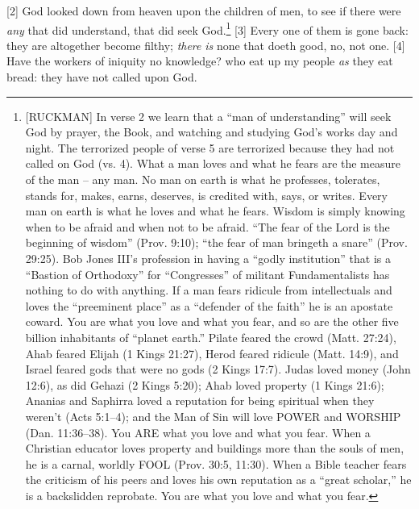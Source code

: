 [2] \textcolor[cmyk]{0.99998,1,0,0}{God looked down from heaven upon the children of men, to see if there were \emph{any} that did understand, that did seek God.}\footnote{[RUCKMAN] In verse 2 we learn that a ``man of understanding'' will seek God by prayer, the Book, and watching and studying God’s works day and night. The terrorized people of verse 5 are terrorized because they had not called on God (vs. 4). What a man loves and what he fears are the measure of the man -- any man. No man on earth is what he professes, tolerates, stands for, makes, earns, deserves, is credited with, says, or writes. Every man on earth is what he loves and what he fears. Wisdom is simply knowing when to be afraid and when not to be afraid. ``The fear of the Lord is the beginning of wisdom'' (Prov. 9:10); ``the fear of man bringeth a snare'' (Prov. 29:25). Bob Jones III’s profession in having a ``godly institution'' that is a ``Bastion of Orthodoxy'' for ``Congresses'' of militant Fundamentalists has nothing to do with anything. If a man fears ridicule from intellectuals and loves the ``preeminent place'' as a ``defender of the faith'' he is an apostate coward. You are what you love and what you fear, and so are the other five billion inhabitants of “planet earth.” Pilate feared the crowd (Matt. 27:24), Ahab feared Elijah (1 Kings 21:27), Herod feared ridicule (Matt. 14:9), and Israel feared gods that were no gods (2 Kings 17:7). Judas loved money (John 12:6), as did Gehazi (2 Kings 5:20); Ahab loved property (1 Kings 21:6); Ananias and Saphirra loved a reputation for being spiritual when they weren't (Acts 5:1--4); and the Man of Sin will love POWER and WORSHIP (Dan. 11:36--38). You ARE what you love and what you fear. When a Christian educator loves property and buildings more than the souls of men, he is a carnal, worldly FOOL (Prov. 30:5, 11:30). When a Bible teacher fears the criticism of his peers and loves his own reputation as a ``great scholar,'' he is a backslidden reprobate. You are what you love and what you fear.\cite{Ruckman1992Psalms} }
[3] \textcolor[cmyk]{0.99998,1,0,0}{Every one of them is gone back: they are altogether become filthy; \emph{there} \emph{is} none that doeth good, no, not one.}
[4] \textcolor[cmyk]{0.99998,1,0,0}{Have the workers of iniquity no knowledge? who eat up my people \emph{as} they eat bread: they have not called upon God.}
